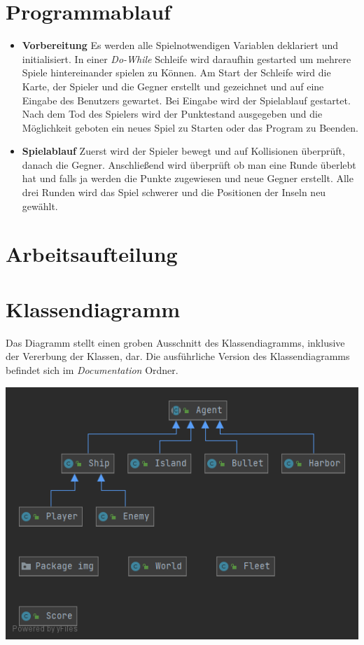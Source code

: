 \documentclass{article}
\begin{document}
\section{Programmablauf}
\begin{itemize}
    \item \textbf{Vorbereitung}
        \newline
        Es werden alle Spielnotwendigen Variablen deklariert und initialisiert. In einer \textit{Do-While} Schleife wird daraufhin gestarted um mehrere Spiele hintereinander spielen zu Können. Am Start der Schleife wird die Karte, der Spieler und die Gegner erstellt und gezeichnet und auf eine Eingabe des Benutzers gewartet. Bei Eingabe wird der Spielablauf gestartet. Nach dem Tod des Spielers wird der Punktestand ausgegeben und die Möglichkeit geboten ein neues Spiel zu Starten oder das Program zu Beenden.
    \item \textbf{Spielablauf}
        \newline
        Zuerst wird der Spieler bewegt und auf Kollisionen überprüft, danach die Gegner. Anschließend wird überprüft ob man eine Runde überlebt hat und falls ja werden die Punkte zugewiesen und neue Gegner erstellt. Alle drei Runden wird das Spiel schwerer und die Positionen der Inseln neu gewählt.
\end{itemize}
\newpage
\section{Arbeitsaufteilung}

\newpage
\section{Klassendiagramm}
Das Diagramm stellt einen groben Ausschnitt des Klassendiagramms, inklusive der Vererbung der Klassen, dar. Die ausführliche Version des Klassendiagramms befindet sich im \textit{Documentation} Ordner.
\newline

\includegraphics[width=\textwidth,height=\textheight,keepaspectratio]{./images/Rough_UML.png}
\newpage
\end{document}
